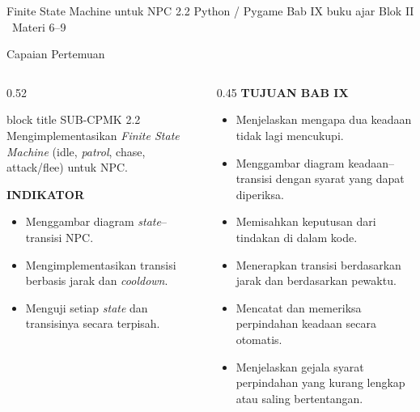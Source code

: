 \documentclass[aspectratio=169,10pt]{beamer}
\begin{document}
  {Finite State Machine untuk NPC}
  {2.2}
  {Python / Pygame}
  {Bab IX buku ajar}
  {Blok II \textperiodcentered\ Materi 6--9}

\begin{frame}{Capaian Pertemuan}
\begin{columns}[T,onlytextwidth]
  \begin{column}{0.52\textwidth}
    \begin{beamercolorbox}[wd=\linewidth,sep=5pt,rounded=true]{block title}
      {\fontsize{6.8}{8}\selectfont\color{ubHead}SUB-CPMK 2.2}\\[2pt]
      {\footnotesize Mengimplementasikan \emph{Finite State Machine}
       (idle, \emph{patrol}, chase, attack/flee) untuk NPC.}
    \end{beamercolorbox}
    \vspace{0.16cm}

    {\fontsize{7}{8.5}\selectfont\bfseries\color{ubAccent}INDIKATOR}\par
    \vspace{0.06cm}
    \begin{itemize}
      \item Menggambar diagram \emph{state}--transisi NPC.
      \item Mengimplementasikan transisi berbasis jarak dan \emph{cooldown}.
      \item Menguji setiap \emph{state} dan transisinya secara terpisah.
    \end{itemize}
  \end{column}
  \begin{column}{0.45\textwidth}
    {\fontsize{7}{8.5}\selectfont\bfseries\color{ubAccent}TUJUAN BAB IX}\par
    \vspace{0.08cm}
    \begin{itemize}
      \item Menjelaskan mengapa dua keadaan tidak lagi mencukupi.
      \item Menggambar diagram keadaan--transisi dengan syarat yang dapat
            diperiksa.
      \item Memisahkan keputusan dari tindakan di dalam kode.
      \item Menerapkan transisi berdasarkan jarak dan berdasarkan pewaktu.
      \item Mencatat dan memeriksa perpindahan keadaan secara otomatis.
      \item Menjelaskan gejala syarat perpindahan yang kurang lengkap atau
            saling bertentangan.
    \end{itemize}
  \end{column}
\end{columns}
\end{frame}
\end{document}
